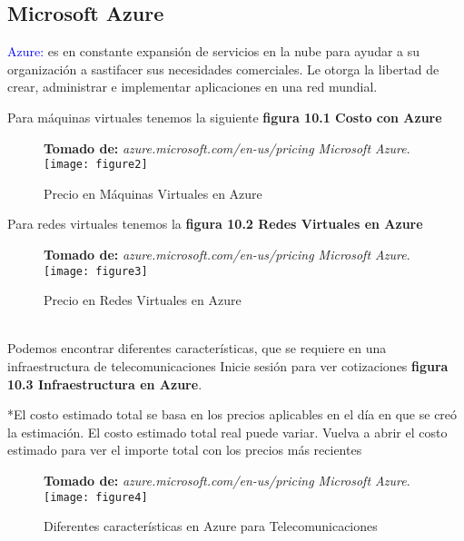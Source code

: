 \subsection{Microsoft Azure}

\textcolor{blue}{Azure:} es en constante expansión de servicios en la nube para ayudar a su organización a sastifacer sus necesidades comerciales. Le otorga la libertad de crear, administrar e implementar aplicaciones en una red mundial.

Para máquinas virtuales tenemos la siguiente \textbf{figura 10.1 Costo con Azure}

\begin{figure}[htbp]
 \footnotesize{\textbf{Tomado de:} \textit{azure.microsoft.com/en-us/pricing Microsoft Azure}.}
  \centering
    {\texttt{[image: figure2]}}%
  \caption{\footnotesize{Precio en Máquinas Virtuales en Azure}}
  \label{fig:fig2subfig}
\end{figure}
Para redes virtuales tenemos la \textbf{figura 10.2 Redes Virtuales en Azure}
\begin{figure}[htbp]
 \footnotesize{\textbf{Tomado de:} \textit{azure.microsoft.com/en-us/pricing Microsoft Azure}.}
  \centering
    {\texttt{[image: figure3]}}%
  \caption{\footnotesize{Precio en Redes Virtuales en Azure}}
  \label{fig:fig2subfig}
\end{figure}
%
\\
Podemos encontrar diferentes características, que se requiere en una infraestructura de telecomunicaciones 
Inicie sesión para ver cotizaciones  \textbf{figura 10.3 Infraestructura en Azure}.

*El costo estimado total se basa en los precios aplicables en el día en que se creó la estimación. El costo estimado total real puede variar. Vuelva a abrir el costo estimado para ver el importe total con los precios más recientes
\\
\begin{figure}[htbp]
 \footnotesize{\textbf{Tomado de:} \textit{azure.microsoft.com/en-us/pricing Microsoft Azure}.}
  \centering
    {\texttt{[image: figure4]}}%
  \caption{\footnotesize{Diferentes características en Azure para Telecomunicaciones}}
  \label{fig:fig2subfig}
\end{figure}

